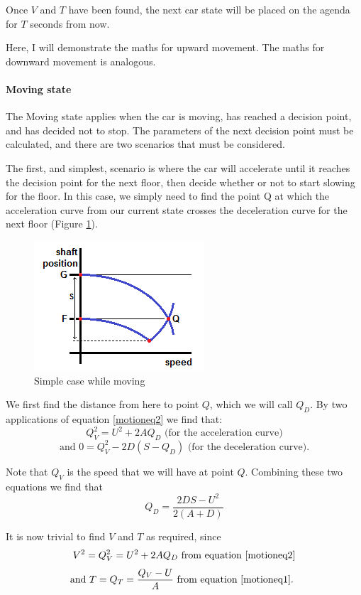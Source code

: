 \documentclass{UoYCSproject}
\begin{document}
Once $V$ and $T$ have been found, the next car state will be placed on the agenda for $T$ seconds from now.

Here, I will demonstrate the maths for upward movement.  The maths for downward movement is analogous.

\paragraph{Moving state}

The Moving state applies when the car is moving, has reached a decision point, and has decided not to stop.  The parameters of the next decision point must be calculated, and there are two scenarios that must be considered.

The first, and simplest, scenario is where the car will accelerate until it reaches the decision point for the next floor, then decide whether or not to start slowing for the floor.  In this case, we simply need to find the point Q at which the acceleration curve from our current state crosses the deceleration curve for the next floor (Figure \ref{movingsimp}).

\begin{figure} [h]
	\centering
	\includegraphics{moving_simp.png}
	\caption{Simple case while moving}
	\label{movingsimp}
\end{figure}

We first find the distance from here to point $Q$, which we will call $Q_D$.  By two applications of equation \ref{motioneq2} we find that:
\[Q_V^2=U^2+2AQ_D \text{ (for the acceleration curve)}\]
\[ \text{and } 0=Q_V^2-2D(S-Q_D) \text{ (for the deceleration curve).} \]

Note that $Q_V$ is the speed that we will have at point $Q$.  Combining these two equations we find that
\[ Q_D=\frac{2DS-U^2}{2(A+D)} \]

It is now trivial to find $V$ and $T$ as required, since
\[ V^2=Q_V^2=U^2+2AQ_D \text{ from equation \ref{motioneq2}} \]
\[ \text{and } T=Q_T=\frac{Q_V-U}{A} \text{ from equation \ref{motioneq1}. } \]
\end{document}
